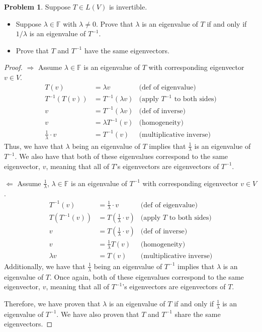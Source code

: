 \documentclass[12pt,reqno]{article}
\newcommand{\F}{\mathbb{F}}
\theoremstyle{definition}
\newtheorem{problem}{Problem}
\begin{document}
\newpage


\begin{problem} 
Suppose $T \in L(V)$ is invertible.
\begin{itemize}
    \item Suppose $\lambda \in \mathbb{F}$ with $\lambda \not = 0$. Prove that $\lambda$ is an eigenvalue of $T$ if and only if $1/\lambda$ is an eigenvalue of $T^{-1}$.
    \item Prove that $T$ and $T^{-1}$ have the same eigenvectors.
\end{itemize}
\end{problem}

\begin{proof}
    $\Rightarrow$ Assume $\lambda\in\F$ is an eigenvalue of $T$ with corresponding eigenvector $v\in V$.
    \begin{align*}
        T(v) &= \lambda v &\text{(def of eigenvalue)}\\
        T^{-1}(T(v)) &= T^{-1}(\lambda v) & \text{(apply $T^{-1}$ to both sides)}\\
        v &= T^{-1}(\lambda v) & \text{(def of inverse)}\\
        v &= \lambda T^{-1}(v) & \text{(homogeneity)}\\
        \frac{1}{\lambda}\cdot v &= T^{-1}(v) & \text{(multiplicative inverse)}
    \end{align*}
    Thus, we have that $\lambda$ being an eigenvalue of $T$ implies that $\frac{1}{\lambda}$ is an eigenvalue of $T^{-1}$. We also have that both of these eigenvalues correspond to the same eigenvector, $v$, meaning that all of $T$'s eigenvectors are eigenvectors of $T^{-1}$.
    
    $\Leftarrow$ Assume $\frac{1}{\lambda}$, $\lambda\in\F$ is an eigenvalue of $T^{-1}$ with corresponding eigenvector $v\in V$.
    \begin{align*}
        T^{-1}(v) &= \frac{1}{\lambda}\cdot v & \text{(def of eigenvalue)}\\
        T(T^{-1}(v)) &= T(\frac{1}{\lambda}\cdot v) & \text{(apply $T$ to both sides)}\\
        v &= T(\frac{1}{\lambda}\cdot v) & \text{(def of inverse)}\\
        v &= \frac{1}{\lambda}T(v) & \text{(homogeneity)}\\
        \lambda v &= T(v) & \text{(multiplicative inverse)}
    \end{align*}
    Additionally, we have that $\frac{1}{\lambda}$ being an eigenvalue of $T^{-1}$ implies that $\lambda$ is an eigenvalue of $T$. Once again, both of these eigenvalues correspond to the same eigenvector, $v$, meaning that all of $T^{-1}$'s eigenvectors are eigenvectors of $T$. 
    
    Therefore, we have proven that $\lambda$ is an eigenvalue of $T$ if and only if $\frac{1}{\lambda}$ is an eigenvalue of $T^{-1}$. We have also proven that $T$ and $T^{-1}$ share the same eigenvectors.

    \newpage
\end{proof}
\end{document}
